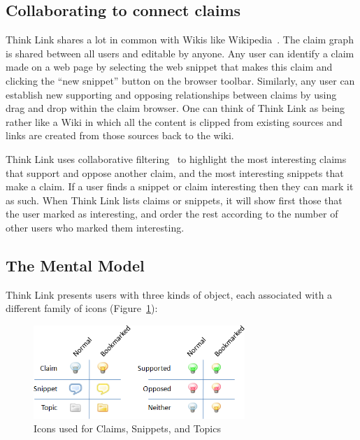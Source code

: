 \documentclass{chi2009}
\begin{document}
\subsection{Collaborating to connect claims}

Think Link shares a lot in common with Wikis like Wikipedia~\cite{wikipedia}. The claim graph is shared between all users and editable by anyone. Any user can identify a claim made on a web page by selecting the web snippet that makes this claim and clicking the ``new snippet'' button on the browser toolbar. Similarly, any user can establish new supporting and opposing relationships between claims by using drag and drop within the claim browser. One can think of Think Link as being rather like a Wiki in which all the content is clipped from existing sources and links are created from those sources back to the wiki.

Think Link uses collaborative filtering~\cite{collective} to highlight the most interesting claims that support and oppose another claim, and the most interesting snippets that make a claim. If a user finds a snippet or claim interesting then they can mark it as such. When Think Link lists claims or snippets, it will show first those that the user marked as interesting, and order the rest according to the number of other users who marked them interesting.

\subsection{The Mental Model}

Think Link presents users with three kinds of object, each associated with a different family of icons (Figure~\ref{bookmark_icons}): 	

\begin{figure}[tb]
	\begin{center}
	\includegraphics[width=8cm]{../screenshots/bookmark_icons.png}
	\caption{Icons used for Claims, Snippets, and Topics}
	\label{bookmark_icons}
	\end{center}
\end{figure}
\end{document}
